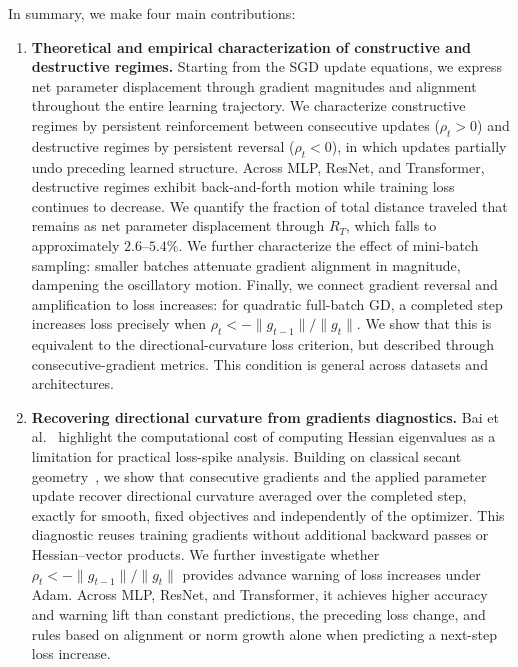 In summary, we make four main contributions:
\begin{enumerate}
\item \textbf{Theoretical and empirical characterization of constructive and destructive regimes.} Starting from the SGD update equations, we express net parameter displacement through gradient magnitudes and alignment throughout the entire learning trajectory. We characterize constructive regimes by persistent reinforcement between consecutive updates (\(\rho_t>0\)) and destructive regimes by persistent reversal (\(\rho_t<0\)), in which updates partially undo preceding learned structure. Across MLP, ResNet, and Transformer, destructive regimes exhibit back-and-forth motion while training loss continues to decrease. We quantify the fraction of total distance traveled that remains as net parameter displacement through \(R_T\), which falls to approximately \(2.6\)--\(5.4\%\). We further characterize the effect of mini-batch sampling: smaller batches attenuate gradient alignment in magnitude, dampening the oscillatory motion. Finally, we connect gradient reversal and amplification to loss increases: for quadratic full-batch GD, a completed step increases loss precisely when \(\rho_t<-\|g_{t-1}\|/\|g_t\|\). We show that this is equivalent to the directional-curvature loss criterion, but described through consecutive-gradient metrics. This condition is general across datasets and architectures.

\item \textbf{Recovering directional curvature from gradients diagnostics.} Bai et al.~\cite{bai2026spikes} highlight the computational cost of computing Hessian eigenvalues as a limitation for practical loss-spike analysis. Building on classical secant geometry~\cite{barzilai1988two,tan2016bbsgd}, we show that consecutive gradients and the applied parameter update recover directional curvature averaged over the completed step, exactly for smooth, fixed objectives and independently of the optimizer. This diagnostic reuses training gradients without additional backward passes or Hessian--vector products. We further investigate whether \(\rho_t<-\|g_{t-1}\|/\|g_t\|\) provides advance warning of loss increases under Adam. Across MLP, ResNet, and Transformer, it achieves higher accuracy and warning lift than constant predictions, the preceding loss change, and rules based on alignment or norm growth alone when predicting a next-step loss increase.


\end{enumerate}
